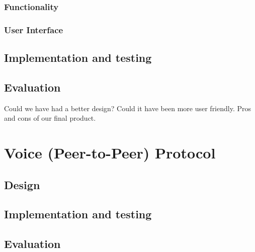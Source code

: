 \documentclass{l3proj}
\begin{document}
\subsection{Functionality}


\subsection{User Interface}


\section{Implementation and testing}


\section{Evaluation}

Could we have had a better design? Could it have been more user friendly. Pros and cons of our final product.

\chapter{Voice (Peer-to-Peer) Protocol}
\label{p2p}


\section{Design}


\section{Implementation and testing}


\section{Evaluation}
\end{document}
